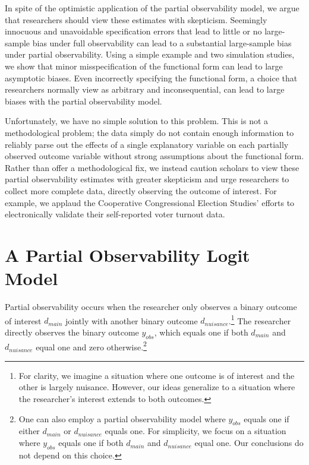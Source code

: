 \documentclass[10pt]{article}
\begin{document}
In spite of the optimistic application of the partial observability model, we argue that researchers should view these estimates with skepticism. Seemingly innocuous and unavoidable specification errors that lead to little or no large-sample bias under full observability can lead to a substantial large-sample bias under partial observability. Using a simple example and two simulation studies, we show that minor misspecification of the functional form can lead to large asymptotic biases. Even incorrectly specifying the functional form, a choice that researchers normally view as arbitrary and inconsequential, can lead to large biases with the partial observability model. 

Unfortunately, we have no simple solution to this problem. This is not a methodological problem; the data simply do not contain enough information to reliably parse out the effects of a single explanatory variable on each partially observed outcome variable without strong assumptions about the functional form. Rather than offer a methodological fix, we instead caution scholars to view these partial observability estimates with greater skepticism and urge researchers to collect more complete data, directly observing the outcome of interest. For example, we applaud the Cooperative Congressional Election Studies' efforts to electronically validate their self-reported voter turnout data.


\section*{A Partial Observability Logit Model}

Partial observability occurs when the researcher only observes a binary outcome of interest $d_{main}$ jointly with another binary outcome $d_{nuisance}$.\footnote{For clarity, we imagine a situation where one outcome is of interest and the other is largely nuisance. 
However, our ideas generalize to a situation where the researcher's interest extends to both outcomes.}
The researcher directly observes the binary outcome $y_{obs}$, which equals one if both $d_{main}$ and $d_{nuisance}$ equal one and zero otherwise.\footnote{One can also employ a partial observability model where $y_{obs}$ equals one if either $d_{main}$ or $d_{nuisance}$ equals one. 
For simplicity, we focus on a situation where $y_{obs}$ equals one if both $d_{main}$ and $d_{nuisance}$ equal one. 
Our conclusions do not depend on this choice.}
\end{document}
